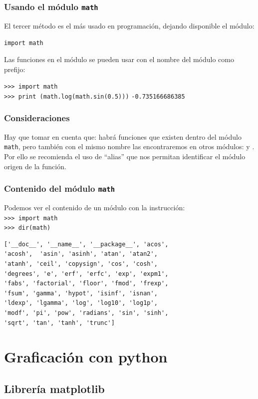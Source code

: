 \documentclass[12pt]{beamer}
\begin{document}
\begin{frame}[fragile]
\frametitle{Usando el módulo \texttt{math}}
El tercer método es el más usado en programación, dejando disponible el módulo:
\begin{center}
\verb|import math|
\end{center}
\pause
Las funciones en el módulo se pueden usar con el nombre del módulo como prefijo:
\pause
\begin{exampleblock}{}
\verb|>>> import math| \\
\verb|>>> print (math.log(math.sin(0.5)))|
\verb|-0.735166686385|
\end{exampleblock}
\end{frame}
\begin{frame}
\frametitle{Consideraciones}
Hay que tomar en cuenta que: habrá funciones que existen dentro del módulo \texttt{math}, \pause pero también con el mismo nombre las encontraremos en otros módulos:  y .
\\
\bigskip
\pause
Por ello se recomienda el uso de \enquote{alias} que nos permitan identificar el módulo origen de la función.
\end{frame}
\begin{frame}[fragile]
\frametitle{Contenido del módulo \texttt{math}}
Podemos ver el contenido de un módulo con la instrucción:
\\
\verb|>>> import math| \\
\verb|>>> dir(math)|
\fontsize{10}{10}\selectfont
\begin{verbatim}
['__doc__', '__name__', '__package__', 'acos',
'acosh',  'asin', 'asinh', 'atan', 'atan2',
'atanh', 'ceil', 'copysign', 'cos', 'cosh',
'degrees', 'e', 'erf', 'erfc', 'exp', 'expm1',
'fabs', 'factorial', 'floor', 'fmod', 'frexp',
'fsum', 'gamma', 'hypot', 'isinf', 'isnan',
'ldexp', 'lgamma', 'log', 'log10', 'log1p',
'modf', 'pi', 'pow', 'radians', 'sin', 'sinh',
'sqrt', 'tan', 'tanh', 'trunc']
\end{verbatim}
\end{frame}

\section{Graficación con python}
\subsection{Librería matplotlib}
\end{document}
